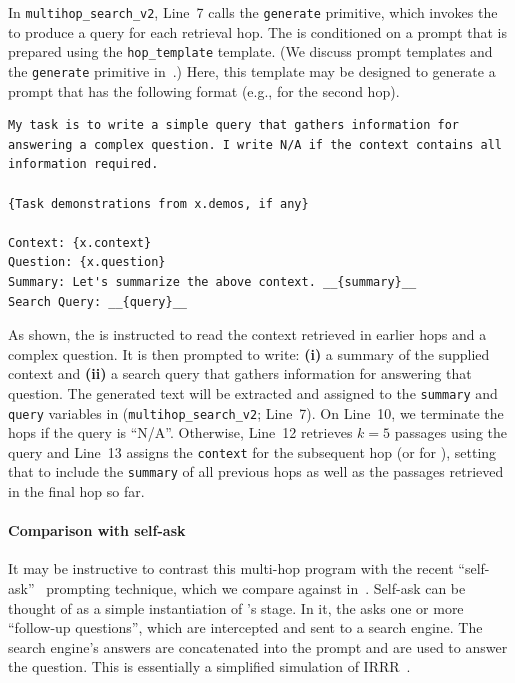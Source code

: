 In \texttt{multihop\_search\_v2}, Line~7 calls the \texttt{generate} primitive, which invokes the \LM{} to produce a query for each retrieval hop. The \LM{} is conditioned on a prompt that is prepared using the \texttt{hop\_template} template. (We discuss prompt templates and the \texttt{generate} primitive in~.) Here, this template may be designed to generate a prompt that has the following format (e.g., for the second hop).

\begin{samepage}
\begin{lstlisting}[breaklines=true]
My task is to write a simple query that gathers information for answering a complex question. I write N/A if the context contains all information required.

{Task demonstrations from x.demos, if any}

Context: {x.context}
Question: {x.question}
Summary: Let's summarize the above context. __{summary}__
Search Query: __{query}__
\end{lstlisting}
\end{samepage}

As shown, the \LM{} is instructed to read the context retrieved in earlier hops and a complex question. It is then prompted to write: \textbf{(i)} a summary of the supplied context and \textbf{(ii)} a search query that gathers information for answering that question. The generated text will be extracted and assigned to the \texttt{summary} and \texttt{query} variables in (\texttt{multihop\_search\_v2}; Line~7). On Line~10, we terminate the hops if the query is ``N/A''. Otherwise, Line~12 retrieves $k=5$ passages using the query and Line~13 assigns the \texttt{context} for the subsequent hop (or for \predict), setting that to include the \texttt{summary} of all previous hops as well as the passages retrieved in the final hop so far.

\paragraph{Comparison with self-ask} It may be instructive to contrast this multi-hop \DSP program with the recent ``self-ask''~\cite{press2022measuring} prompting technique, which we compare against in~. Self-ask can be thought of as a simple instantiation of \DSP's \search stage. In it, the \LM{} asks one or more ``follow-up questions'', which are intercepted and sent to a search engine. The search engine's answers are concatenated into the prompt and are used to answer the question. This is essentially a simplified simulation of IRRR~\cite{qi2020retrieve}.


